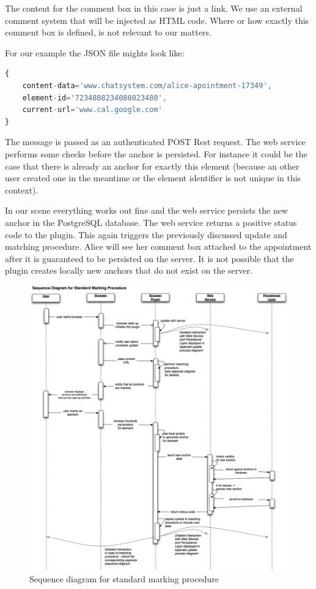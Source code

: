 The content for the comment box in this case is just a link. We use an external comment system that will be injected as HTML code. Where or how exactly this comment box is defined, is not relevant to our matters.

For our example the JSON file mights look like:

\begin{lstlisting}[language=JavaScript]
{
	content-data='www.chatsystem.com/alice-apointment-17349',
	element-id='7234808234088023480',
	current-url='www.cal.google.com'
}
\end{lstlisting}

The message is passed as an authenticated POST Rest request. The web service performs some checks before the anchor is persisted. For instance it could be the case that there is already an anchor for exactly this element (because an other user created one in the meantime or the element identifier is not unique in this context). 

In our scene everything works out fine and the web service persists the new anchor in the PostgreSQL database. The web service returns a positive status code to the plugin. This again triggers the previously discussed update and matching procedure. Alice will see her comment box attached to the appointment after it is guaranteed to be persisted on the server. It is not possible that the plugin creates locally new anchors that do not exist on the server. 

\begin{figure}[h!] \centering
		\includegraphics[width=13cm]{images/sequence-marking-process.png}
		\caption{Sequence diagram for standard marking procedure}
		\label{sequence-marking-process}
\end{figure} 

